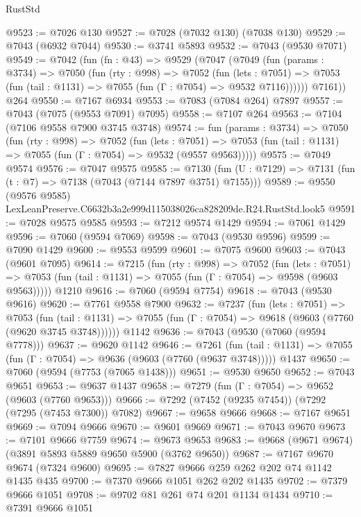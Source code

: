 \begin{lexlean}{RustStd}
\begin{coremodule}
@9523 := @7026 @130
@9527 := @7028 (@7032 @130) (@7038 @130)
@9529 := @7043 (@6932 @7044)
@9530 := @3741 @5893
@9532 := @7043 (@9530 @7071)
@9549 := @7042
    (fun (fn : @43) =>
    @9529
      (@7047
        (@7049
          (fun (params : @3734) =>
          @7050
            (fun (rty : @998) =>
            @7052
              (fun (lets : @7051) =>
              @7053 (fun (tail : @1131) => @7055 (fun (Γ : @7054) => @9532 @7116))))))
        @7161))
    @264
@9550 := @7167 @6934
@9553 := @7083 (@7084 @264) @7897
@9557 := @7043 (@7075 (@9553 @7091) @7095)
@9558 := @7107 @264
@9563 := @7104 (@7106 @9558 @7900 @3745 @3748)
@9574 := fun (params : @3734) =>
  @7050
    (fun (rty : @998) =>
    @7052
      (fun (lets : @7051) =>
      @7053 (fun (tail : @1131) => @7055 (fun (Γ : @7054) => @9532 (@9557 @9563)))))
@9575 := @7049 @9574
@9576 := @7047 @9575
@9585 := @7130 (fun (U : @7129) => @7131 (fun (t : @7) => @7138 (@7043 (@7144 @7897 @3751) @7155)))
@9589 := @9550 (@9576 @9585) LexLeanPreserve.C6632b3a2e999d115038026ca828209de.R24.RustStd.look5
@9591 := @7028 @9575 @9585
@9593 := @7212 @9574 @1429
@9594 := @7061 @1429
@9596 := @7060 (@9594 @7069)
@9598 := @7043 (@9530 @9596)
@9599 := @7090 @1429
@9600 := @9553 @9599
@9601 := @7075 @9600
@9603 := @7043 (@9601 @7095)
@9614 := @7215
    (fun (rty : @998) =>
    @7052
      (fun (lets : @7051) =>
      @7053 (fun (tail : @1131) => @7055 (fun (Γ : @7054) => @9598 (@9603 @9563)))))
    @1210
@9616 := @7060 (@9594 @7754)
@9618 := @7043 (@9530 @9616)
@9620 := @7761 @9558 @7900
@9632 := @7237
    (fun (lets : @7051) =>
    @7053
      (fun (tail : @1131) => @7055 (fun (Γ : @7054) => @9618 (@9603 (@7760 (@9620 @3745 @3748))))))
    @1142
@9636 := @7043 (@9530 (@7060 (@9594 @7778)))
@9637 := @9620 @1142
@9646 := @7261
    (fun (tail : @1131) => @7055 (fun (Γ : @7054) => @9636 (@9603 (@7760 (@9637 @3748)))))
    @1437
@9650 := @7060 (@9594 (@7753 (@7065 @1438)))
@9651 := @9530 @9650
@9652 := @7043 @9651
@9653 := @9637 @1437
@9658 := @7279 (fun (Γ : @7054) => @9652 (@9603 (@7760 @9653)))
@9666 := @7292 (@7452 (@9235 @7454)) (@7292 (@7295 (@7453 @7300)) @7082)
@9667 := @9658 @9666
@9668 := @7167 @9651
@9669 := @7094 @9666
@9670 := @9601 @9669
@9671 := @7043 @9670
@9673 := @7101 @9666 @7759
@9674 := @9673 @9653
@9683 := @9668 (@9671 @9674) (@3891 @5893 @5889 @9650 @5900 (@3762 @9650))
@9687 := @7167 @9670 @9674 (@7324 @9600)
@9695 := @7827 @9666 @259 @262 @202 @74 @1142 @1435 @435
@9700 := @7370 @9666 @1051 @262 @202 @1435
@9702 := @7379 @9666 @1051
@9708 := @9702 @81 @261 @74 @201 @1134 @1434
@9710 := @7391 @9666 @1051

\end{coremodule}
\end{lexlean}
